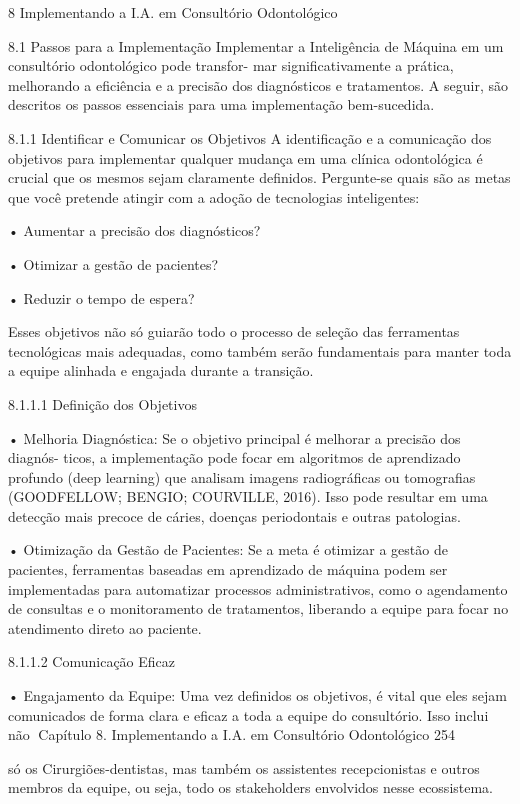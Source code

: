 8 Implementando a I.A. em Consultório
  Odontológico

8.1       Passos para a Implementação
Implementar a Inteligência de Máquina em um consultório odontológico pode transfor-
mar significativamente a prática, melhorando a eficiência e a precisão dos diagnósticos
e tratamentos. A seguir, são descritos os passos essenciais para uma implementação
bem-sucedida.

8.1.1     Identificar e Comunicar os Objetivos
A identificação e a comunicação dos objetivos para implementar qualquer mudança
em uma clínica odontológica é crucial que os mesmos sejam claramente definidos.
Pergunte-se quais são as metas que você pretende atingir com a adoção de tecnologias
inteligentes:

   • Aumentar a precisão dos diagnósticos?

   • Otimizar a gestão de pacientes?

   • Reduzir o tempo de espera?

        Esses objetivos não só guiarão todo o processo de seleção das ferramentas
tecnológicas mais adequadas, como também serão fundamentais para manter toda a
equipe alinhada e engajada durante a transição.

8.1.1.1   Definição dos Objetivos

   • Melhoria Diagnóstica: Se o objetivo principal é melhorar a precisão dos diagnós-
     ticos, a implementação pode focar em algoritmos de aprendizado profundo (deep
     learning) que analisam imagens radiográficas ou tomografias (GOODFELLOW;
     BENGIO; COURVILLE, 2016). Isso pode resultar em uma detecção mais precoce
     de cáries, doenças periodontais e outras patologias.

   • Otimização da Gestão de Pacientes: Se a meta é otimizar a gestão de pacientes,
     ferramentas baseadas em aprendizado de máquina podem ser implementadas
     para automatizar processos administrativos, como o agendamento de consultas e
     o monitoramento de tratamentos, liberando a equipe para focar no atendimento
     direto ao paciente.

8.1.1.2   Comunicação Eficaz

   • Engajamento da Equipe: Uma vez definidos os objetivos, é vital que eles sejam
     comunicados de forma clara e eficaz a toda a equipe do consultório. Isso inclui não
Capítulo 8. Implementando a I.A. em Consultório Odontológico                       254


      só os Cirurgiões-dentistas, mas também os assistentes recepcionistas e outros
      membros da equipe, ou seja, todo os stakeholders envolvidos nesse ecossistema.

